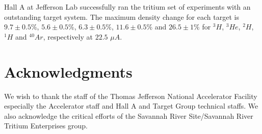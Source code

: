 \documentclass[final,5p,times,twocolumn]{elsarticle}
\begin{document}
Hall A at Jefferson Lab successfully ran the tritium set of experiments with an outstanding target system.  
The maximum density change for each target is $9.7 \pm 0.5 \%$, $5.6 \pm 0.5\% $, $6.3 \pm 0.5\% $, $11.6\pm 0.5\% $ 
and $26.5 \pm 1 \%$ for $^{3}H$, $^{3}He$, $^{2}H$, $^{1}H$ and $^{40}Ar$, respectively at $22.5$ $\mu A$. 

\section{Acknowledgments}

We wish to thank the staff of the Thomas Jefferson National Accelerator Facility especially the Accelerator staff and  Hall A and Target Group technical staffs. We also acknowledge the critical efforts of the Savannah River Site/Savannah River Tritium Enterprises group.


% 
%
\end{document}
